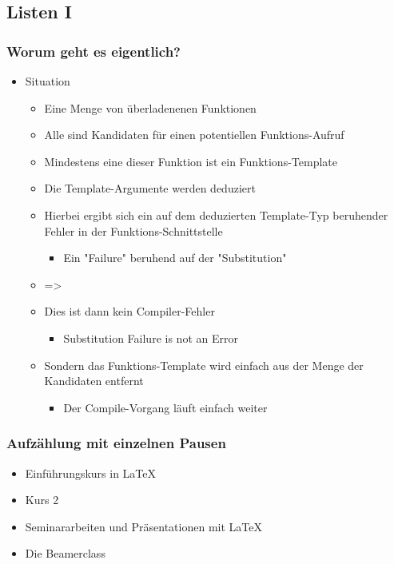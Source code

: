\documentclass[hyperref={pdfpagelabels=false}]{beamer}
\begin{document}
\subsection{Listen I}
\begin{frame}
\frametitle{Worum geht es eigentlich?}
\begin{itemize}
\item Situation

\begin{itemize}
\item Eine Menge von überladenenen Funktionen
\item Alle sind Kandidaten für einen potentiellen Funktions-Aufruf
\item Mindestens eine dieser Funktion ist ein Funktions-Template
\item Die Template-Argumente werden deduziert
\item Hierbei ergibt sich ein auf dem deduzierten Template-Typ beruhender Fehler in der Funktions-Schnittstelle
\begin{itemize}
\item Ein "Failure" beruhend auf der "Substitution"
\end{itemize}
\end{itemize}

\begin{itemize}
\item =>
\item Dies ist dann kein Compiler-Fehler
\begin{itemize}
\item Substitution Failure is not an Error
\end{itemize}

\item Sondern das Funktions-Template wird einfach aus der Menge der Kandidaten entfernt
\begin{itemize}
\item Der Compile-Vorgang läuft einfach weiter
\end{itemize}

\end{itemize} 
\end{itemize} 
\end{frame}

\begin{frame}
\frametitle{Aufz\"ahlung mit einzelnen Pausen}
\begin{itemize}
\item  Einf\"uhrungskurs in \LaTeX{} \pause 
\item  Kurs 2 \pause 
\item  Seminararbeiten und Pr\"asentationen mit \LaTeX{} \pause 
\item  Die Beamerclass
\end{itemize} 
\end{frame}
\end{document}

